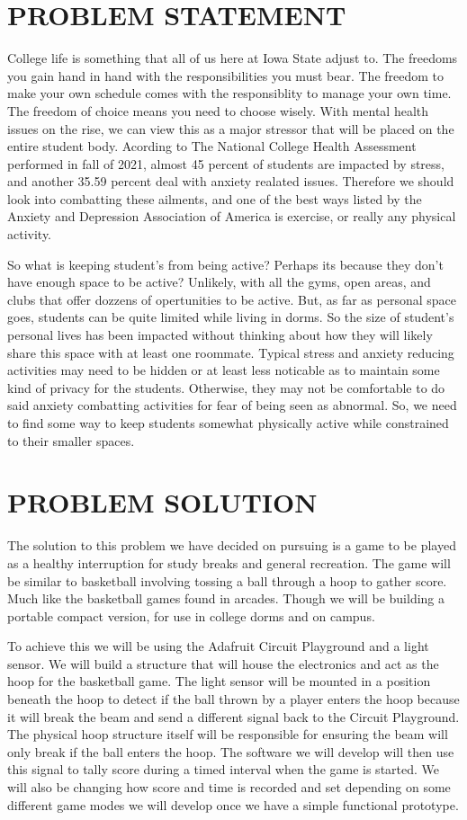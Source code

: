 \documentclass[12pt]{article}
\begin{document}
\section{PROBLEM STATEMENT}
College life is something that all of us here at Iowa State adjust to. The freedoms you gain hand in hand with the responsibilities you must bear. The freedom to make your own schedule comes with the responsiblity to manage your own time. The freedom of choice means you need to choose wisely. With mental health issues on the rise, we can view this as a major stressor that will be placed on the entire student body. Acording to The National College Health Assessment performed in fall of 2021, almost 45 percent of students are impacted by stress, and another 35.59 percent deal with anxiety realated issues. Therefore we should look into combatting these ailments, and one of the best ways listed by the Anxiety and Depression Association of America is exercise, or really any physical activity.

So what is keeping student's from being active? Perhaps its because they don't have enough space to be active? Unlikely, with all the gyms, open areas, and clubs that offer dozzens of opertunities to be active. But, as far as personal space goes, students can be quite limited while living in dorms. So the size of student's personal lives has been impacted without thinking about how they will likely share this space with at least one roommate. Typical stress and anxiety reducing activities may need to be hidden or at least less noticable as to maintain some kind of privacy for the students. Otherwise, they may not be comfortable to do said anxiety combatting activities for fear of being seen as abnormal. So, we need to find some way to keep students somewhat physically active while constrained to their smaller spaces.

\section{PROBLEM SOLUTION}
The solution to this problem we have decided on pursuing is a game to be played as a healthy interruption for study breaks and general recreation. The game will be similar to basketball involving tossing a ball through a hoop to gather score. Much like the basketball games found in arcades. Though we will be building a portable compact version, for use in college dorms and on campus.

To achieve this we will be using the Adafruit Circuit Playground and a light sensor. We will build a structure that will house the electronics and act as the hoop for the basketball game. The light sensor will be mounted in a position beneath the hoop to detect if the ball thrown by a player enters the hoop because it will break the beam and send a different signal back to the Circuit Playground. The physical hoop structure itself will be responsible for ensuring the beam will only break if the ball enters the hoop. The software we will develop will then use this signal to tally score during a timed interval when the game is started. We will also be changing how score and time is recorded and set depending on some different game modes we will develop once we have a simple functional prototype.
\end{document}
